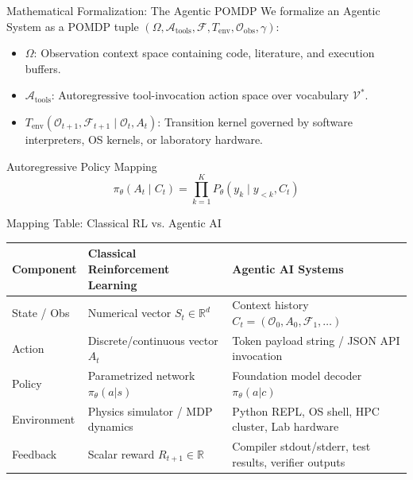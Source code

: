 \documentclass[10pt, aspectratio=169]{beamer}
\begin{document}
\begin{frame}{Mathematical Formalization: The Agentic POMDP}
  We formalize an Agentic System as a POMDP tuple $(\Omega, \mathcal{A}_{\text{tools}}, \mathcal{F}, T_{\text{env}}, \mathcal{O}_{\text{obs}}, \gamma)$:
  \begin{itemize}
    \item $\Omega$: Observation context space containing code, literature, and execution buffers.
    \item $\mathcal{A}_{\text{tools}}$: Autoregressive tool-invocation action space over vocabulary $\mathcal{V}^*$.
    \item $T_{\text{env}}(\mathcal{O}_{t+1}, \mathcal{F}_{t+1} \mid \mathcal{O}_t, A_t)$: Transition kernel governed by software interpreters, OS kernels, or laboratory hardware.
  \end{itemize}

  \begin{block}{Autoregressive Policy Mapping}
    $$\pi_\theta(A_t \mid C_t) = \prod_{k=1}^K P_\theta(y_k \mid y_{<k}, C_t)$$
  \end{block}
\end{frame}

\begin{frame}{Mapping Table: Classical RL vs. Agentic AI}
  \begin{table}
    \small
    \begin{tabular}{lll}
      \toprule
      \textbf{Component} & \textbf{Classical Reinforcement Learning} & \textbf{Agentic AI Systems} \\
      \midrule
      State / Obs & Numerical vector $S_t \in \mathbb{R}^d$ & Context history $C_t = (\mathcal{O}_0, A_0, \mathcal{F}_1, \dots)$ \\
      Action & Discrete/continuous vector $A_t$ & Token payload string / JSON API invocation \\
      Policy & Parametrized network $\pi_\theta(a|s)$ & Foundation model decoder $\pi_\theta(a|c)$ \\
      Environment & Physics simulator / MDP dynamics & Python REPL, OS shell, HPC cluster, Lab hardware \\
      Feedback & Scalar reward $R_{t+1} \in \mathbb{R}$ & Compiler stdout/stderr, test results, verifier outputs \\
      \bottomrule
    \end{tabular}
  \end{table}
\end{frame}
\end{document}
